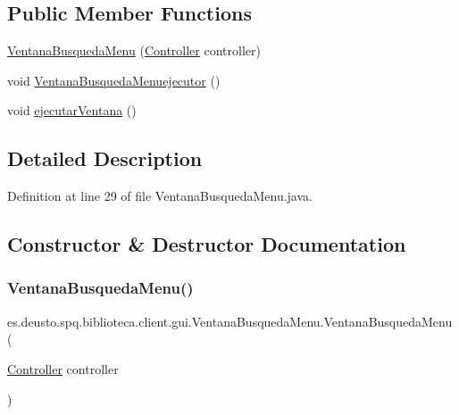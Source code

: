 \subsection*{Public Member Functions}
\begin{DoxyCompactItemize}
\item 
\mbox{\hyperlink{classes_1_1deusto_1_1spq_1_1biblioteca_1_1client_1_1gui_1_1_ventana_busqueda_menu_a658523d6f90443c42cab22ed93ebede8}{Ventana\+Busqueda\+Menu}} (\mbox{\hyperlink{classes_1_1deusto_1_1spq_1_1biblioteca_1_1controller_1_1_controller}{Controller}} controller)
\item 
void \mbox{\hyperlink{classes_1_1deusto_1_1spq_1_1biblioteca_1_1client_1_1gui_1_1_ventana_busqueda_menu_a2e14e0da230c4e460dd7e656b53622b0}{Ventana\+Busqueda\+Menuejecutor}} ()
\item 
void \mbox{\hyperlink{classes_1_1deusto_1_1spq_1_1biblioteca_1_1client_1_1gui_1_1_ventana_busqueda_menu_a3680f3f4268980870f82f8a2c1a02890}{ejecutar\+Ventana}} ()
\end{DoxyCompactItemize}


\subsection{Detailed Description}


Definition at line 29 of file Ventana\+Busqueda\+Menu.\+java.



\subsection{Constructor \& Destructor Documentation}
\mbox{\label{classes_1_1deusto_1_1spq_1_1biblioteca_1_1client_1_1gui_1_1_ventana_busqueda_menu_a658523d6f90443c42cab22ed93ebede8}} 
\subsubsection{\texorpdfstring{Ventana\+Busqueda\+Menu()}{VentanaBusquedaMenu()}}
{\footnotesize\ttfamily es.\+deusto.\+spq.\+biblioteca.\+client.\+gui.\+Ventana\+Busqueda\+Menu.\+Ventana\+Busqueda\+Menu (\begin{DoxyParamCaption}\item[{\mbox{\hyperlink{classes_1_1deusto_1_1spq_1_1biblioteca_1_1controller_1_1_controller}{Controller}}}]{controller }\end{DoxyParamCaption})}


